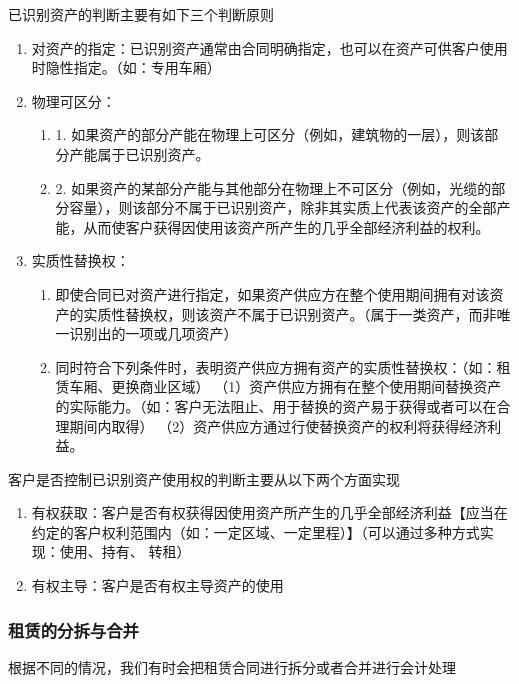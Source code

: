 \documentclass[UTF8,12pt]{ctexart}
\numberwithin{equation}{section} %
\numberwithin{figure}{section}
\numberwithin{table}{section}
\begin{document}
	已识别资产的判断主要有如下三个判断原则
	\begin{enumerate}
		
		\item 对资产的指定：已识别资产通常由合同明确指定，也可以在资产可供客户使用时隐性指定。（如：专用车厢）
		
		\item 物理可区分：
		\begin{enumerate}
			\item 1. 如果资产的部分产能在物理上可区分（例如，建筑物的一层），则该部分产能属于已识别资产。
			
			\item 2. 如果资产的某部分产能与其他部分在物理上不可区分（例如，光缆的部分容量），则该部分不属于已识别资产，除非其实质上代表该资产的全部产能，从而使客户获得因使用该资产所产生的几乎全部经济利益的权利。
		\end{enumerate}
		
		\item 实质性替换权：	
		\begin{enumerate}
			\item 即使合同已对资产进行指定，如果资产供应方在整个使用期间拥有对该资产的实质性替换权，则该资产不属于已识别资产。（属于一类资产，而非唯一识别出的一项或几项资产）
			
			\item 同时符合下列条件时，表明资产供应方拥有资产的实质性替换权：（如：租赁车厢、更换商业区域）
			（1）资产供应方拥有在整个使用期间替换资产的实际能力。（如：客户无法阻止、用于替换的资产易于获得或者可以在合理期间内取得）
			（2）资产供应方通过行使替换资产的权利将获得经济利益。
		\end{enumerate}
	\end{enumerate}
	
	客户是否控制已识别资产使用权的判断主要从以下两个方面实现
	\begin{enumerate}
		\item 有权获取：客户是否有权获得因使用资产所产生的几乎全部经济利益【应当在约定的客户权利范围内（如：一定区域、一定里程）】（可以通过多种方式实现：使用、持有、
		转租）
		
		\item 有权主导：客户是否有权主导资产的使用
	\end{enumerate}

	\subsubsection{租赁的分拆与合并}
	根据不同的情况，我们有时会把租赁合同进行拆分或者合并进行会计处理
\end{document}
